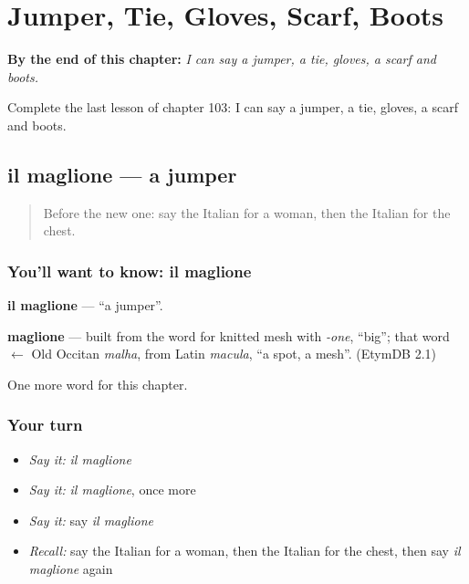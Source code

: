 
\chapter{Jumper, Tie, Gloves, Scarf, Boots}
\label{ch:it-jumper-tie-gloves-scarf-boots}

\begin{chapteropening}
\textbf{By the end of this chapter:} \emph{I can say a jumper, a tie, gloves, a scarf and boots.}

Complete the last lesson of chapter 103: I can say a jumper, a tie, gloves, a scarf and boots.
\end{chapteropening}

\section[il maglione]{il maglione — a jumper}

\label{lesson:IT-C103-maglione}



\begin{quote}
Before the new one: say the Italian for a woman, then the Italian for the chest.
\end{quote}

\subsection*{You'll want to know: il maglione}
\textbf{il maglione} — \textquotedblleft{}a jumper\textquotedblright{}.

\begin{cousinweb}
\textbf{maglione} — built from the word for knitted mesh with \emph{-one}, \textquotedblleft{}big\textquotedblright{}; that word $\leftarrow$ Old Occitan \emph{malha}, from Latin \emph{macula}, \textquotedblleft{}a spot, a mesh\textquotedblright{}. (EtymDB 2.1)
\end{cousinweb}

\begin{grammarlens}[title={What you've built}]
One more word for this chapter.
\end{grammarlens}

\subsection*{Your turn}
\begin{itemize}
\raggedright
  \item \emph{Say it:} \emph{il maglione}
  \item \emph{Say it:} \emph{il maglione}, once more
  \item \emph{Say it:} say \emph{il maglione}
  \item \emph{Recall:} say the Italian for a woman, then the Italian for the chest, then say \emph{il maglione} again
\end{itemize}

